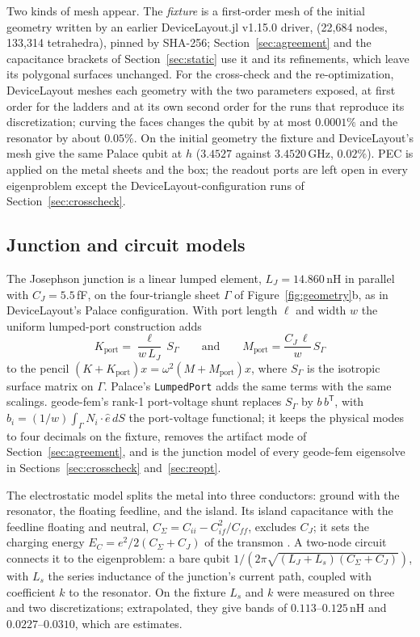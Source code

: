 \documentclass{anvil-paper}
\begin{document}
Two kinds of mesh appear. The \emph{fixture} is a first-order mesh of the
initial geometry written by an earlier DeviceLayout.jl v1.15.0 driver,
 (22{,}684 nodes,
133{,}314 tetrahedra), pinned by SHA-256;
Section~\ref{sec:agreement} and the capacitance brackets of
Section~\ref{sec:static} use it and its refinements, which leave its
polygonal surfaces unchanged. For the cross-check and the re-optimization,
DeviceLayout meshes each geometry with the two parameters exposed, at first
order for the ladders and at its own second order for the runs that
reproduce its discretization; curving the faces changes the qubit by at
most $0.0001\%$ and the resonator by about $0.05\%$. On the
initial geometry the fixture and DeviceLayout's mesh give the same Palace
qubit at $h$ ($3.4527$ against $3.4520$\,GHz, $0.02\%$). PEC is applied on
the metal sheets and the box; the readout ports are left open in every
eigenproblem except the DeviceLayout-configuration runs of
Section~\ref{sec:crosscheck}.

\subsection{Junction and circuit models}
\label{sec:junction}

The Josephson junction is a linear lumped element, $L_J = 14.860$\,nH in
parallel with $C_J = 5.5$\,fF, on the four-triangle sheet $\Gamma$ of
Figure~\ref{fig:geometry}b, as in DeviceLayout's Palace configuration. With
port length $\ell$ and width $w$ the uniform lumped-port construction adds
\begin{equation}
  K_{\mathrm{port}} = \frac{\ell}{w\,L_J}\, S_\Gamma
  \qquad\text{and}\qquad
  M_{\mathrm{port}} = \frac{C_J\,\ell}{w}\, S_\Gamma
  \label{eq:port}
\end{equation}
to the pencil $(K + K_{\mathrm{port}})x = \omega^2(M + M_{\mathrm{port}})x$,
where $S_\Gamma$ is the isotropic surface matrix on $\Gamma$. Palace's
\texttt{LumpedPort} adds the same terms with the same scalings. geode-fem's
rank-1 port-voltage shunt replaces $S_\Gamma$ by $b\,b^{\mathsf T}$, with
$b_i = (1/w)\int_\Gamma N_i\cdot\hat e\,dS$ the port-voltage functional; it
keeps the physical modes to four decimals on the fixture, removes the
artifact mode of Section~\ref{sec:agreement}, and is the junction model of
every geode-fem eigensolve in Sections~\ref{sec:crosscheck}
and~\ref{sec:reopt}.

The electrostatic model splits the metal into three conductors: ground
with the resonator, the floating feedline, and the island. Its island
capacitance with the feedline floating and neutral,
$C_\Sigma = C_{ii} - C_{if}^2/C_{ff}$, excludes $C_J$; it sets the charging
energy $E_C = e^2/2(C_\Sigma + C_J)$ of the transmon \citep{koch2007charge}. A two-node circuit
connects it to the eigenproblem: a bare qubit
$1/(2\pi\sqrt{(L_J + L_s)(C_\Sigma + C_J)})$, with $L_s$ the series
inductance of the junction's current path, coupled with coefficient $k$
to the resonator. On the fixture $L_s$ and $k$ were measured on three and
two discretizations; extrapolated, they give bands of $0.113$--$0.125$\,nH
and $0.0227$--$0.0310$, which are estimates.
\end{document}
